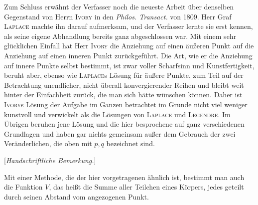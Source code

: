Zum Schluss erwähnt der Verfasser noch die neueste Arbeit über denselben Gegenstand von Herrn \textsc{Ivory} in den \textit{Philos. Transact.} von 1809. Herr Graf \textsc{Laplace} machte ihn darauf aufmerksam, und der Verfasser lernte sie erst kennen, als seine eigene Abhandlung bereits ganz abgeschlossen war. Mit einem sehr glücklichen Einfall hat Herr \textsc{Ivory} die Anziehung auf einen äußeren Punkt auf die Anziehung auf einen inneren Punkt zurückgeführt. Die Art, wie er die Anziehung auf innere Punkte selbst bestimmt, ist zwar voller Scharfsinn und Kunstfertigkeit, beruht aber, ebenso wie \textsc{Laplace}s Lösung für äußere Punkte, zum Teil auf der Betrachtung unendlicher, nicht überall konvergierender Reihen und bleibt weit hinter der Einfachheit zurück, die man sich hätte wünschen können. Daher ist \textsc{Ivory}s Lösung der Aufgabe im Ganzen betrachtet im Grunde nicht viel weniger kunstvoll und verwickelt als die Lösungen von \textsc{Laplace} und \textsc{Legendre}. Im Übrigen beruhen jene Lösung und die hier besprochene auf ganz verschiedenen Grundlagen und haben gar nichts gemeinsam außer dem Gebrauch der zwei Veränderlichen, die oben mit $p,q$ bezeichnet sind.

\bigskip
\begin{center}
[\textit{Handschriftliche Bemerkung.}]
\end{center}
\medskip
Mit einer Methode, die der hier vorgetragenen ähnlich ist, bestimmt man auch die Funktion $V$, das heißt die Summe aller Teilchen eines Körpers, jedes geteilt durch seinen Abstand vom angezogenen Punkt.
